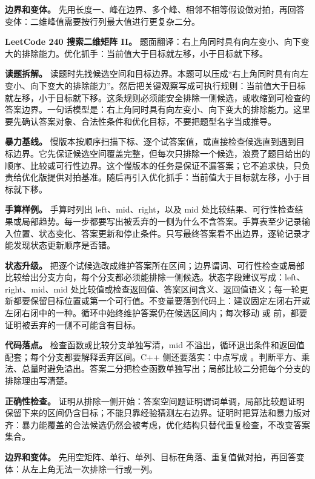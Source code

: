 \textbf{边界和变体。} 先用长度一、峰在边界、多个峰、相邻不相等假设做对拍，再回答变体：二维峰值需要按行列最大值进行更复杂二分。

\noindent\textbf{LeetCode 240 搜索二维矩阵 II。} 题面翻译：右上角同时具有向左变小、向下变大的排除能力。优化抓手：当前值大于目标就左移，小于目标就下移。

\textbf{读题拆解。} 读题时先找候选空间和目标边界。本题可以压成“右上角同时具有向左变小、向下变大的排除能力”。然后把关键观察写成可执行规则：当前值大于目标就左移，小于目标就下移。这条规则必须能安全排除一侧候选，或收缩到可检查的答案边界。一句话模型是：右上角同时具有向左变小、向下变大的排除能力。这里要先确认答案对象、合法性条件和优化目标，不要把题型名字当成推导。

\textbf{暴力基线。} 慢版本按顺序扫描下标、逐个试答案值，或直接检查候选直到遇到目标边界。它先保证候选空间覆盖完整，但每次只排除一个候选，浪费了题目给出的顺序、比较或可行性边界。这个慢版本的任务是保证不漏答案；它不追求快，只负责给优化版提供对拍基准。随后再引入优化抓手：当前值大于目标就左移，小于目标就下移。

\textbf{手算样例。} 手算时列出 left、mid、right，以及 mid 处比较结果、可行性检查结果或局部趋势。每一步都要写出被丢弃的一侧为什么不含答案。手算表至少记录输入位置、状态变化、答案更新和停止条件。只写最终答案看不出边界，逐轮记录才能发现状态更新顺序是否错。

\textbf{状态升级。} 把逐个试候选改成维护答案所在区间；边界谓词、可行性检查或局部比较给出分支方向，每个分支都必须能排除一侧候选。状态字段建议写成：left、right、mid、mid 处比较值或检查返回值、答案区间含义、返回值语义；每一轮更新都要保留目标位置或第一个可行值。不变量要落到代码上：建议固定左闭右开或左闭右闭中的一种。循环中始终维护答案仍在候选区间内；每次移动  或  前，都要证明被丢弃的一侧不可能含有目标。

\textbf{代码落点。} 检查函数或比较分支单独写清，mid 不溢出，循环退出条件和返回值配套；每个分支都要解释丢弃区间。C++ 侧还要落实：中点写成 。判断平方、乘法、总量时避免溢出。答案二分把检查函数单独写出；局部比较二分把每个分支的排除理由写清楚。

\textbf{正确性检查。} 证明从排除一侧开始：答案空间题证明谓词单调，局部比较题证明保留下来的区间仍含目标；不能只靠经验猜测左右边界。证明时把算法和暴力版对齐：暴力能覆盖的合法候选仍然会被考虑，优化结构只替代重复检查，不改变答案集合。

\textbf{边界和变体。} 先用空矩阵、单行、单列、目标在角落、重复值做对拍，再回答变体：从左上角无法一次排除一行或一列。

